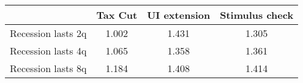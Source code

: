 \begin{tabular}{@{}lccc@{}} 
\toprule 
& Tax Cut    & UI extension    & Stimulus check    \\  \midrule 
Recession lasts 2q &1.002  & 1.431  & 1.305     \\ 
Recession lasts 4q &1.065  & 1.358  & 1.361     \\ 
Recession lasts 8q &1.184  & 1.408  & 1.414     \\ 
\end{tabular}  
